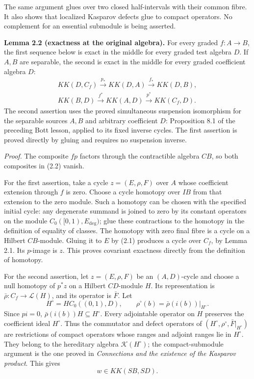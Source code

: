 \documentclass[
  11pt,
]{article}
\begin{document}
The same argument glues over two closed half-intervals with their common
fibre. It also shows that localized Kasparov defects glue to compact
operators. No complement for an essential submodule is being asserted.

\textbf{Lemma 2.2 (exactness at the original algebra).} For every graded
\(f:A\to B\), the first sequence below is exact in the middle for every
graded test algebra \(D\). If \(A,B\) are separable, the second is exact
in the middle for every graded coefficient algebra \(D\): \[
\begin{gathered}
KK(D,C_f)\xrightarrow{p_*}KK(D,A)
\xrightarrow{f_*}KK(D,B),\\
KK(B,D)\xrightarrow{f^*}KK(A,D)
\xrightarrow{p^*}KK(C_f,D).
\end{gathered}
\tag{2.2}
\] The second assertion uses the proved simultaneous suspension
isomorphism for the separable sources \(A,B\) and arbitrary coefficient
\(D\): Proposition 8.1 of the preceding Bott lesson, applied to its
fixed inverse cycles. The first assertion is proved directly by gluing
and requires no suspension inverse.

\emph{Proof.} The composite \(fp\) factors through the contractible
algebra \(CB\), so both composites in (2.2) vanish.

For the first assertion, take a cycle \(z=(E,\rho,F)\) over \(A\) whose
coefficient extension through \(f\) is zero. Choose a cycle homotopy
over \(IB\) from that extension to the zero module. Such a homotopy can
be chosen with the specified initial cycle: any degenerate summand is
joined to zero by its constant operators on the module
\(C_0([0,1),E_{\mathrm{deg}})\); glue these contractions to the homotopy
in the definition of equality of classes. The homotopy with zero final
fibre is a cycle on a Hilbert \(CB\)-module. Gluing it to \(E\) by (2.1)
produces a cycle over \(C_f\), by Lemma 2.1. Its \(p\)-image is \(z\).
This proves covariant exactness directly from the definition of
homotopy.

For the second assertion, let \(z=(E,\rho,F)\) be an \((A,D)\)-cycle and
choose a null homotopy of \(p^*z\) on a Hilbert \(CD\)-module \(H\). Its
representation is \(\bar\rho:C_f\to\mathcal L(H)\), and its operator is
\(\bar F\). Let \[
H^\circ=H C_0((0,1),D),\qquad
\rho^\circ(b)=\bar\rho(i(b))|_{H^\circ}.
\tag{2.3}
\] Since \(pi=0\), \(\bar\rho(i(b))H\subseteq H^\circ\). Every
adjointable operator on \(H\) preserves the coefficient ideal
\(H^\circ\). Thus the commutator and defect operators of
\((H^\circ,\rho^\circ,\bar F|_{H^\circ})\) are restrictions of compact
operators whose ranges and adjoint ranges lie in \(H^\circ\). They
belong to the hereditary algebra \(\mathcal K(H^\circ)\); the
compact-submodule argument is the one proved in \emph{Connections and
the existence of the Kasparov product}. This gives \[
w\in KK(SB,SD).
\tag{2.4}
\]
\end{document}
